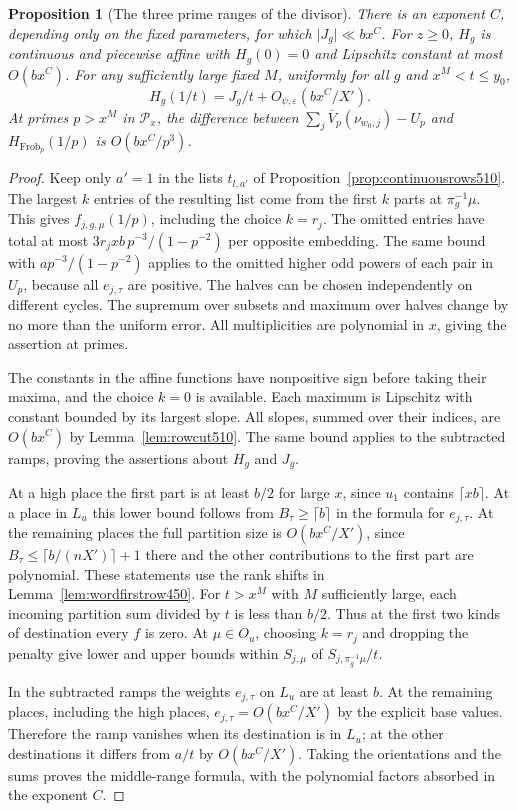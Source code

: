 \documentclass[a4paper,11pt]{article}
\newtheorem{proposition}{Proposition}[section]
\theoremstyle{definition}
\theoremstyle{remark}
\numberwithin{equation}{section}
\begin{document}
\begin{proposition}[The three prime ranges of the divisor]\leavevmode
\label{prop:middleweights511}
There is an exponent \(C\), depending only on the fixed
parameters, for which \(\lvert J_g\rvert\ll bx^C\). For
\(z\ge0\), \(H_g\) is continuous and piecewise affine with
\(H_g(0)=0\) and Lipschitz constant at most \(O(bx^C)\).
For any sufficiently large fixed \(M\), uniformly for all \(g\)
and \(x^M<t\le y_0\),
\[
              H_g(1/t)=J_g/t+O_{\psi,\varepsilon}(bx^C/X').
\]
At primes \(p>x^M\) in \(\mathcal P_x\), the difference
between \(\sum_j\overline V_p(\nu_{w_0,j})-U_p\) and
\(H_{\operatorname{Frob}_p}(1/p)\) is \(O(bx^C/p^3)\).
\end{proposition}
\begin{proof}
Keep only \(a'=1\) in the lists \(t_{l,a'}\) of
Proposition~\ref{prop:continuousrows510}. The largest \(k\)
entries of the resulting list come from the first \(k\)
parts at \(\pi_g^{-1}\mu\). This gives \(f_{j,g,\mu}(1/p)\),
including the choice \(k=r_j\). The omitted entries have total
at most \(3r_jxb\,p^{-3}/(1-p^{-2})\) per opposite embedding.
The same bound with \(a p^{-3}/(1-p^{-2})\) applies to the
omitted higher odd powers of each pair in \(U_p\), because
all \(e_{j,\tau}\) are positive. The halves can be chosen
independently on different cycles. The supremum over subsets
and maximum over halves change by no more than the uniform
error. All multiplicities are polynomial in \(x\), giving the
assertion at primes.

The constants in the affine functions have nonpositive sign
before taking their maxima, and the choice \(k=0\) is available.
Each maximum is Lipschitz with constant bounded by its largest
slope. All slopes, summed over their indices, are \(O(bx^C)\)
by Lemma~\ref{lem:rowcut510}. The same bound applies to the
subtracted ramps, proving the assertions about \(H_g\) and \(J_g\).

At a high place the first part is at least \(b/2\) for large
\(x\), since \(u_1\) contains \(\lceil xb\rceil\). At a place
in \(L_u\) this lower bound follows from \(B_\tau\ge\lceil b\rceil\)
in the formula for \(e_{j,\tau}\). At the remaining places
the full partition size is \(O(bx^C/X')\), since
\(B_\tau\le\lceil b/(nX')\rceil+1\) there and the other
contributions to the first part are polynomial. These statements
use the rank shifts in Lemma~\ref{lem:wordfirstrow450}.
For \(t>x^M\) with \(M\) sufficiently large, each incoming
partition sum divided by \(t\) is less than \(b/2\).
Thus at the first two kinds of destination every \(f\) is zero.
At \(\mu\in O_u\), choosing \(k=r_j\) and dropping the penalty
give lower and upper bounds within \(S_{j,\mu}\) of
\(S_{j,\pi_g^{-1}\mu}/t\).

In the subtracted ramps the weights \(e_{j,\tau}\) on \(L_u\)
are at least \(b\). At the remaining places, including the
high places, \(e_{j,\tau}=O(bx^C/X')\) by the explicit base
values. Therefore the ramp vanishes when its destination is
in \(L_u\); at the other destinations it differs from \(a/t\)
by \(O(bx^C/X')\). Taking the orientations and the sums proves
the middle-range formula, with the polynomial factors absorbed
in the exponent \(C\).
\end{proof}
\end{document}
